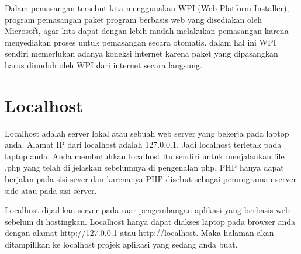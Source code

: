 Dalam pemasangan tersebut kita menggunakan WPI (Web Platform Installer), program pemasangan paket program berbasis web yang disediakan oleh Microsoft, agar kita dapat dengan lebih mudah melakukan pemasangan karena menyediakan proses untuk pemasangan secara otomatis. dalam hal ini WPI sendiri memerlukan adanya koneksi internet karena paket yang dipasangkan harus diunduh oleh WPI dari internet secara langsung. 

\section{Localhost}
Localhost adalah server lokal atau sebuah web server yang bekerja pada laptop anda. Alamat IP dari localhost adalah 127.0.0.1.
Jadi localhost terletak pada laptop anda. Anda membutuhkan localhost itu sendiri untuk menjalankan file .php yang telah di jelaskan sebelumnya di pengenalan php. PHP hanya dapat berjalan pada sisi sever dan karenanya PHP disebut sebagai pemrograman server side atau pada sisi server.
\par
Localhost dijadikan server pada saar pengembangan aplikasi yang berbasis web sebelum di hostingkan. Localhost hanya dapat diakses laptop pada browser anda dengan alamat http://127.0.0.1 atau http://localhost. Maka halaman akan ditampillkan ke localhost projek aplikasi yang sedang anda buat. 
